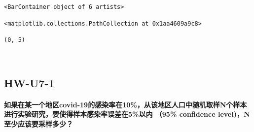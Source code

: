 \documentclass[11pt]{ctexart}
\makeatletter
\newcommand{\boxspacing}{\kern\kvtcb@left@rule\kern\kvtcb@boxsep}
\newcommand{\prompt}[4]{
        \ttfamily\llap{{\color{#2}[#3]:\hspace{3pt}#4}}\vspace{-\baselineskip}
    }
\makeatother
\begin{document}
\begin{tcolorbox}[breakable, size=fbox, boxrule=.5pt, pad at break*=1mm, opacityfill=0]
    \prompt{Out}{outcolor}{65}{\boxspacing}
    \begin{Verbatim}[commandchars=\\\{\}]
        <BarContainer object of 6 artists>
    \end{Verbatim}
\end{tcolorbox}

\begin{tcolorbox}[breakable, size=fbox, boxrule=.5pt, pad at break*=1mm, opacityfill=0]
    \prompt{Out}{outcolor}{65}{\boxspacing}
    \begin{Verbatim}[commandchars=\\\{\}]
        <matplotlib.collections.PathCollection at 0x1aa4609a9c8>
    \end{Verbatim}
\end{tcolorbox}

\begin{tcolorbox}[breakable, size=fbox, boxrule=.5pt, pad at break*=1mm, opacityfill=0]
    \prompt{Out}{outcolor}{65}{\boxspacing}
    \begin{Verbatim}[commandchars=\\\{\}]
        (0, 5)
    \end{Verbatim}
\end{tcolorbox}

\begin{center}
\end{center}
{ \hspace*{\fill} \\}

\hypertarget{hw-u7-1}{%
    \subsection{HW-U7-1}\label{hw-u7-1}}

\hypertarget{ux5982ux679cux5728ux67d0ux4e00ux4e2aux5730ux533acovid-19ux7684ux611fux67d3ux7387ux572810ux4eceux8be5ux5730ux533aux4ebaux53e3ux4e2dux968fux673aux53d6ux6837nux4e2aux6837ux672cux8fdbux884cux5b9eux9a8cux7814ux7a76ux8981ux4f7fux5f97ux6837ux672cux611fux67d3ux7387ux8befux5deeux57285ux4ee5ux5185-95-confidence-levelnux81f3ux5c11ux5e94ux8be5ux8981ux91c7ux6837ux591aux5c11}{%
    \paragraph{如果在某一个地区covid-19的感染率在10\%，从该地区人口中随机取样N个样本进行实验研究，要使得样本感染率误差在5\%以内
        （95\% confidence
        level)，N至少应该要采样多少？}\label{ux5982ux679cux5728ux67d0ux4e00ux4e2aux5730ux533acovid-19ux7684ux611fux67d3ux7387ux572810ux4eceux8be5ux5730ux533aux4ebaux53e3ux4e2dux968fux673aux53d6ux6837nux4e2aux6837ux672cux8fdbux884cux5b9eux9a8cux7814ux7a76ux8981ux4f7fux5f97ux6837ux672cux611fux67d3ux7387ux8befux5deeux57285ux4ee5ux5185-95-confidence-levelnux81f3ux5c11ux5e94ux8be5ux8981ux91c7ux6837ux591aux5c11}}
\end{document}
